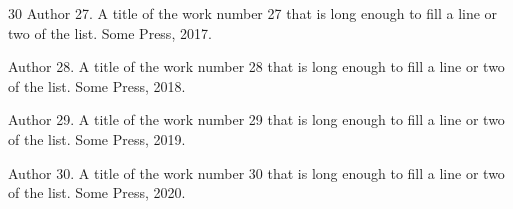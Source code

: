 \documentclass{article}
\begin{document}
\begin{thebibliography}{30}
Author 27.
\newblock A title of the work number 27 that is long enough to fill a line or two of the list.
\newblock Some Press, 2017.

Author 28.
\newblock A title of the work number 28 that is long enough to fill a line or two of the list.
\newblock Some Press, 2018.

Author 29.
\newblock A title of the work number 29 that is long enough to fill a line or two of the list.
\newblock Some Press, 2019.

Author 30.
\newblock A title of the work number 30 that is long enough to fill a line or two of the list.
\newblock Some Press, 2020.
\end{thebibliography}
\end{document}
